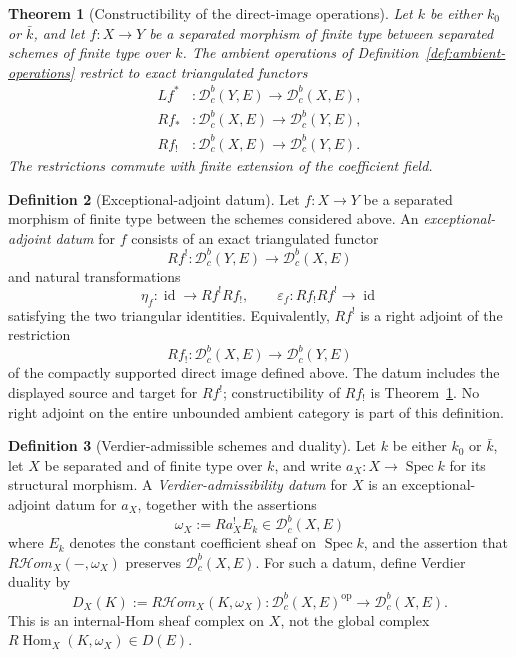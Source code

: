 \documentclass[10pt]{article}
\newtheorem{theorem}{Theorem}[section]
\theoremstyle{definition}
\newtheorem{definition}[theorem]{Definition}
\newcommand{\Dbc}{\mathcal D^b_c}
\newcommand{\Spec}{\operatorname{Spec}}
\begin{document}
\begin{theorem}[Constructibility of the direct-image operations]
\label{thm:constructible-direct-images}
Let \(k\) be either \(k_0\) or \(\bar k\), and let \(f:X\to Y\) be a
separated morphism of finite type between separated schemes of finite type
over \(k\).  The ambient operations of
Definition~\ref{def:ambient-operations} restrict to exact triangulated
functors
\[
 \begin{aligned}
 Lf^*&:\Dbc(Y,E)\longrightarrow\Dbc(X,E),\\
 Rf_*&:\Dbc(X,E)\longrightarrow\Dbc(Y,E),\\
 Rf_!&:\Dbc(X,E)\longrightarrow\Dbc(Y,E).
 \end{aligned}
\]
The restrictions commute with finite extension of the coefficient field.
\end{theorem}

\begin{definition}[Exceptional-adjoint datum]
\label{def:exceptional-adjoint}
Let \(f:X\to Y\) be a separated morphism of finite type between the schemes
considered above.  An \emph{exceptional-adjoint datum} for \(f\) consists of
an exact triangulated functor
\[
 Rf^!:\Dbc(Y,E)\longrightarrow\Dbc(X,E)
\]
and natural transformations
\[
 \eta_f:\operatorname{id}\longrightarrow Rf^!Rf_!,
 \qquad
 \varepsilon_f:Rf_!Rf^!\longrightarrow\operatorname{id}
\]
satisfying the two triangular identities.  Equivalently, \(Rf^!\) is a
right adjoint of the restriction
\[
 Rf_!:\Dbc(X,E)\longrightarrow\Dbc(Y,E)
\]
of the compactly supported direct image defined above.  The datum includes
the displayed source and target for \(Rf^!\); constructibility of \(Rf_!\)
is Theorem~\ref{thm:constructible-direct-images}.  No right adjoint on the
entire unbounded ambient category is part of this definition.
\end{definition}

\begin{definition}[Verdier-admissible schemes and duality]
\label{def:verdier-admissible}
Let \(k\) be either \(k_0\) or \(\bar k\), let \(X\) be separated and of
finite type over \(k\), and write \(a_X:X\to\Spec k\) for its structural
morphism.  A \emph{Verdier-admissibility datum} for \(X\) is an
exceptional-adjoint datum for \(a_X\), together with the assertions
\[
 \omega_X:=Ra_X^!E_k\in\Dbc(X,E)
\]
where \(E_k\) denotes the constant coefficient sheaf on \(\Spec k\),
and the assertion that \(R\mathcal Hom_X(-,\omega_X)\) preserves
\(\Dbc(X,E)\).  For such a datum, define Verdier duality by
\[
 D_X(K):=R\mathcal Hom_X(K,\omega_X):
 \Dbc(X,E)^{\mathrm{op}}\longrightarrow\Dbc(X,E).
\]
This is an internal-Hom sheaf complex on \(X\), not the global complex
\(R\operatorname{Hom}_X(K,\omega_X)\in D(E)\).
\end{definition}
\end{document}

